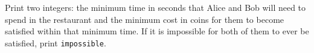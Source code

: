 
Print two integers: the minimum time in seconds that Alice and Bob will need to spend in the restaurant and the minimum cost in coins for them to become satisfied within that minimum time.
If it is impossible for both of them to ever be satisfied, print \texttt{impossible}.

